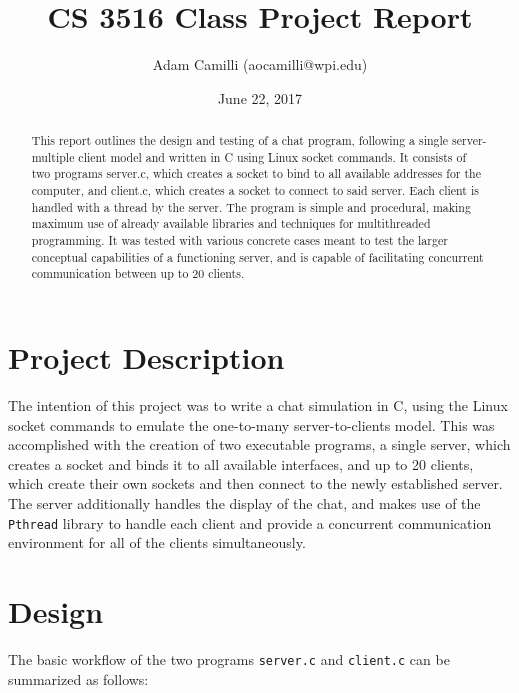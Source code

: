 \documentclass[titlepage, 14pt]{article}
\title{CS 3516 Class Project Report}
\author{Adam Camilli (aocamilli@wpi.edu)}
\date{June 22, 2017}
\begin{document}
\maketitle

\begin{abstract}
This report outlines the design and testing of a chat program, following a single server-multiple client model and written in C using Linux socket commands. It consists of two programs server.c, which creates a socket to bind to all available addresses for the computer, and client.c, which creates a socket to connect to said server. Each client is handled with a thread by the server. The program is simple and procedural, making maximum use of already available libraries and techniques for multithreaded programming. It was tested with various concrete cases meant to test the larger conceptual capabilities of a functioning server, and is capable of facilitating concurrent communication between up to 20 clients.
\end{abstract}

\tableofcontents

\newpage

\section{Project Description}
The intention of this project was to write a chat simulation in C, using the Linux socket commands to emulate the one-to-many server-to-clients model. This was accomplished with the creation of two executable programs, a single server, which creates a socket and binds it to all available interfaces,  and up to 20 clients, which create their own sockets and then connect to the newly established server. The server additionally handles the display of the chat, and makes use of the \verb|Pthread| library to handle each client and provide a concurrent communication environment for all of the clients simultaneously.

\section{Design}
The basic workflow of the two programs \verb|server.c| and \verb|client.c| can be summarized as follows:
\end{document}
